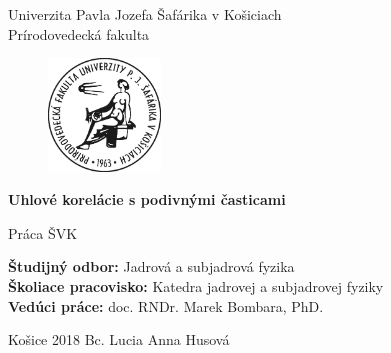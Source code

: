 \documentclass[thesismargins, thesislinespacing]{rnthesis}
\title{}
\author{Lucia Anna Husová}
\begin{document}
\begin{center}
	{\Large Univerzita Pavla Jozefa Šafárika v Košiciach} \\
	{\Large Prírodovedecká fakulta} 
\end{center}

\vspace*{2cm}

\begin{figure}[htbp!]
	\begin{center}
		\includegraphics[width=3cm]{./Obrazky_praca/logo-pf-upjs-cb.jpg}
	\end{center}
\end{figure}

\vspace*{2cm}

\begin{center}
	{\LARGE\bf Uhlové korelácie s podivnými časticami}
\end{center}

\begin{center}
	{\large Práca ŠVK}
\end{center}

\vspace*{5cm}
\begin{flushleft}
{\bf Študijný odbor:}{ Jadrová a subjadrová fyzika} \\
{\bf Školiace pracovisko: }{Katedra jadrovej a subjadrovej fyziky}\\
{\bf Vedúci práce: }{doc. RNDr. Marek Bombara, PhD.}\\
\end{flushleft}
 
 \vspace*{2cm}
 \begin{flushleft}
{\large Košice 2018}
\hspace*{5cm}
{\large Bc. Lucia Anna Husová}
\end{flushleft}

\thispagestyle{empty}
\newpage

\maketitle
\newpage
\tableofcontents
\end{document}
